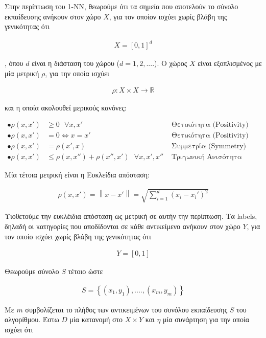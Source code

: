\documentclass[12pt]{article}
\newcommand{\R}{\mathbb{R}}
\newcommand{\norm}[1]{\left\lVert#1\right\rVert}
\begin{document}
Στην περίπτωση του 1-ΝΝ, θεωρούμε ότι τα σημεία που αποτελούν το σύνολο εκπαίδευσης ανήκουν στον χώρο \(X\), για τον οποίον ισχύει χωρίς βλάβη της γενικότητας ότι 

\begin{align*}
	X = [0,1]^d
\end{align*}

, όπου \(d\) είναι η διάσταση του χώρου (\(d = 1, 2, ....\)). Ο χώρος \(X\) είναι εξοπλισμένος με μία μετρική \(ρ\), για την οποία ισχύει 

\begin{align*}
	ρ:X \times X \rightarrow \R
\end{align*} 

και η οποία  ακολουθεί μερικούς κανόνες:

\begin{align*}
	\bullet ρ(x,x') &\geq 0 \text{ } \forall x,x' &\text{ Θετικότητα (Positivity)} \\
	\bullet ρ(x,x') &= 0 \Leftrightarrow x = x' &\text{ Θετικότητα (Positivity)} \\
	\bullet ρ(x,x') &= ρ(x',x) &\text{ Συμμετρία (Symmetry)}\\
	\bullet ρ(x,x') &\leq ρ(x,x'') + ρ(x'',x')  \text{ } \forall x,x',x'' &\text{ Τριγωνική Ανισότητα (Triangle Inequality)}
\end{align*}

Μία τέτοια μετρική είναι η Ευκλείδια απόσταση:

\begin{align*}
	ρ(x,x') = \norm{x- x'} =\sqrt{\sum_{i=1}^{d}(x_i - x_{i}')^2}
\end{align*}

Υιοθετούμε την ευκλέιδια απόσταση ως μετρική σε αυτήν την περίπτωση. Τα labels, δηλαδή οι κατηγορίες που αποδίδονται σε κάθε αντικείμενο ανήκουν στον χώρο \(Y\), για τον οποίο ισχύει χωρίς βλάβη της γενικότητας ότι 

\begin{align*}
	Y = [0,1]
\end{align*}   


Θεωρούμε σύνολο \(S\) τέτοιο ώστε 

\begin{align*}
	S = \left\{(x_1, y_1), ...., (x_m, y_m)\right\}
\end{align*}

Με \(m\) συμβολίζεται το πλήθος των αντικειμένων του συνόλου εκπαίδευσης \(S\) του αλγορίθμου. Έστω \(D\) μία κατανομή στο \(X \times Y\) και \(η\) μία συνάρτηση για την οποία ισχύει ότι
\end{document}
